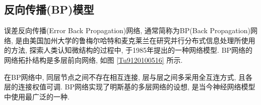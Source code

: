 \subsection{反向传播(BP)模型}
误差反向传播(Error Back Propagation)网络, 通常简称为BP(Back Propagation)网络, 是由美国加州大学的鲁梅尔哈特和麦克莱兰在研究并行分布式信息处理所使用的方法, 探索人类认知微结构的过程中, 于1985年提出的一种网络模型.
BP网络的网络拓扑结构是多层前向网络, 如图 \ref{Tu9120100516} 所示.
\begin{remark}
    在BP网络中, 同层节点之间不存在相互连接, 层与层之间多采用全互连方式, 且各层的连接权值可调. BP网络实现了明斯基的多层网络的设想, 是当今神经网络模型中使用最广泛的一种.
\end{remark}

